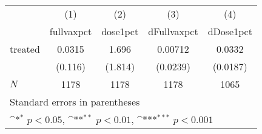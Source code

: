 {
\def\sym#1{\ifmmode^{#1}\else\(^{#1}\)\fi}
\begin{tabular}{l*{4}{c}}
\hline\hline
            &\multicolumn{1}{c}{(1)}&\multicolumn{1}{c}{(2)}&\multicolumn{1}{c}{(3)}&\multicolumn{1}{c}{(4)}\\
            &\multicolumn{1}{c}{fullvaxpct}&\multicolumn{1}{c}{dose1pct}&\multicolumn{1}{c}{dFullvaxpct}&\multicolumn{1}{c}{dDose1pct}\\
\hline
treated     &      0.0315         &       1.696         &     0.00712         &      0.0332         \\
            &     (0.116)         &     (1.814)         &    (0.0239)         &    (0.0187)         \\
\hline
\(N\)       &        1178         &        1178         &        1178         &        1065         \\
\hline\hline
\multicolumn{5}{l}{\footnotesize Standard errors in parentheses}\\
\multicolumn{5}{l}{\footnotesize \sym{*} \(p<0.05\), \sym{**} \(p<0.01\), \sym{***} \(p<0.001\)}\\
\end{tabular}
}
